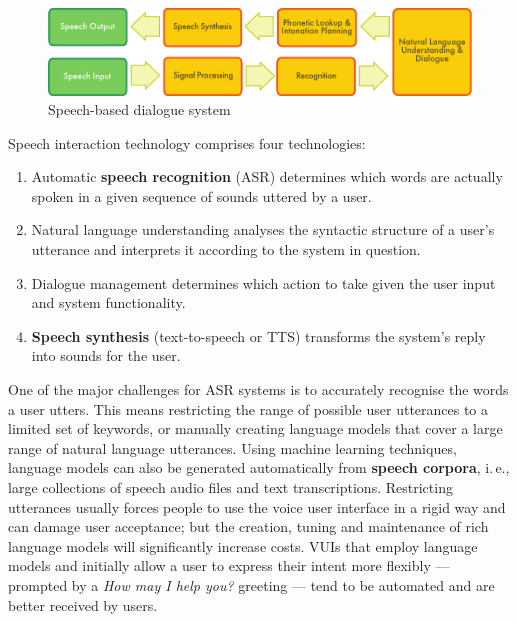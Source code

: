 \begin{multicols}{2}
\begin{figure}[htb]
  \center
  \includegraphics[width=\textwidth]{../_media/english/simple_speech-based_dialogue_architecture}
  \caption{Speech-based dialogue system}
\label{fig:dialoguearch_en}
\end{figure}

Speech interaction technology comprises four technologies: 

\begin{enumerate}
\item Automatic \textbf{speech recognition} (ASR) determines which words are actually spoken in a given sequence of sounds uttered by a user.  
\item Natural language understanding analyses the syntactic structure of a user’s utterance and interprets it according to the system in question.
\item Dialogue management determines which action to take given the user input and system functionality.   
\item \textbf{Speech synthesis} (text-to-speech or TTS) transforms the system’s reply into sounds for the user.
\end{enumerate}

One of the major challenges for ASR systems is to accurately recognise the words a user utters. This means restricting the range of possible user utterances to a limited set of keywords, or manually creating language models that cover a large range of natural language utterances. Using machine learning techniques, language models can also be generated automatically from \textbf{speech corpora}, i.\,e., large collections of speech audio files and text transcriptions. Restricting utterances usually forces people to use the voice user interface in a rigid way and can damage user acceptance; but the creation, tuning and maintenance of rich language models will significantly increase costs. VUIs that employ language models and initially allow a user to express their intent more flexibly — prompted by a \textit{How may I help you?} greeting — tend to be automated and are better received by users.


\end{multicols}
